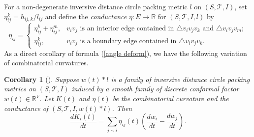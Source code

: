 \documentclass[12pt]{amsart}
\newtheorem{corollary}[theorem]{Corollary}
\begin{document}
For a non-degenerate inversive distance circle packing metric $l$ on $(S, \mathcal{T}, I)$,
set $\eta_{ij}^k = h_{ij,k}/l_{ij}$ and  define the \textit{conductance} $\eta: E\rightarrow \mathbb{R}$ for $(S, \mathcal{T}, I, l)$ by
\begin{equation}
\label{definitioneta}
    \eta_{ij} = \begin{cases}
       \eta_{ij}^k + \eta_{ij}^m , & v_iv_j \text{ is an interior edge contained in } \triangle v_iv_jv_k  \text{ and } \triangle v_iv_jv_m;\\
      \eta_{ij}^k , & v_iv_j \text{ is a boundary edge contained in } \triangle v_iv_jv_k.
      \end{cases}
\end{equation}
As a direct corollary of formula (\ref{angle deform}), we have the following variation of combinatorial curvatures.




\begin{corollary}[\cite{Guo, Xu AIM, Xu MRL}]
 Suppose $w(t)*l$ is a family of inversive distance circle packing metrics on $ ({S},\mathcal{T}, I) $ induced by a smooth family of discrete conformal factor $w(t) \in \mathbb{R}^V$. Let $K(t)$ and $\eta(t)$ be the combinatorial curvature and the conductance of $ ({S},\mathcal{T}, I, w(t)*l)$. Then
 \begin{equation}
     \label{curvature}
     \frac{dK_i(t)}{dt} = \sum_{j\sim i}\eta_{ij}(t)\left(\frac{dw_i}{dt} - \frac{dw_j}{dt}\right).
 \end{equation}

\end{corollary}
\end{document}

